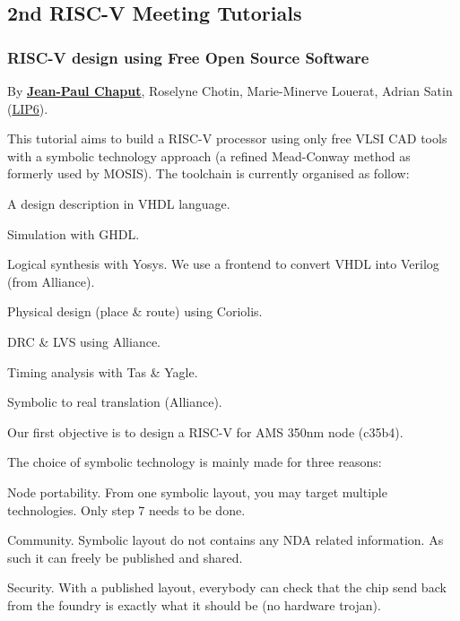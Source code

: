 \documentclass[a4paper, 10pt]{article}
\begin{document}
{ \small

\subsection{2nd RISC-V Meeting Tutorials}
\label{sec:orga05bda0}
\subsubsection{RISC-V design using Free Open Source Software}
\label{sec:org39da51d}
By \textbf{\href{https://www.lip6.fr/actualite/personnes-fiche.php?ident=P109}{Jean-Paul Chaput}}, Roselyne Chotin, Marie-Minerve Louerat, Adrian
Satin (\href{https://www.lip6.fr}{LIP6}).

This tutorial aims to build a RISC-V processor using only free VLSI
CAD tools with a symbolic technology approach (a refined Mead-Conway
method as formerly used by MOSIS). The toolchain is currently
organised as follow:
\begin{enumerate*}[label=(\arabic*)]
\item A design description in VHDL language.
\item Simulation with GHDL.
\item Logical synthesis with Yosys.  We use a frontend to convert VHDL
into Verilog (from Alliance).
\item Physical design (place \& route) using Coriolis.
\item DRC \& LVS using Alliance.
\item Timing analysis with Tas \& Yagle.
\item Symbolic to real translation (Alliance).
\end{enumerate*}

Our first objective is to design a RISC-V for AMS 350nm node (c35b4).

The choice of symbolic technology is mainly made for three reasons:
\begin{enumerate*}
\item Node portability.  From one symbolic layout, you may target
multiple technologies. Only step 7 needs to be done.
\item Community. Symbolic layout do not contains any NDA related
information.  As such it can freely be published and shared.
\item Security.  With a published layout, everybody can check that the
chip send back from the foundry is exactly what it should be (no
hardware trojan).
\end{enumerate*}

}
\end{document}
